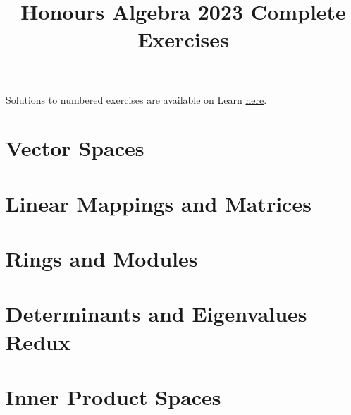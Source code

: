 \documentclass[a4paper]{article}
\title{Honours Algebra 2023 Complete Exercises}
\begin{document}
\maketitle

Solutions to numbered exercises are available on Learn \href{https://www.learn.ed.ac.uk/bbcswebdav/pid-8338476-dt-content-rid-33823325_1/xid-33823325_1}{here}.

\begin{enumerate}
  \section{Vector Spaces}
    
    
    
    
    
    

  \newpage
  \section{Linear Mappings and Matrices}
    
    
    
    

  \newpage
  \section{Rings and Modules}
    
    
    
    
    
    
    

  \newpage
  \section{Determinants and Eigenvalues Redux}
    
    
    
    
    
    
    

  \newpage
  \section{Inner Product Spaces}
    
    
\end{enumerate}
\end{document}
